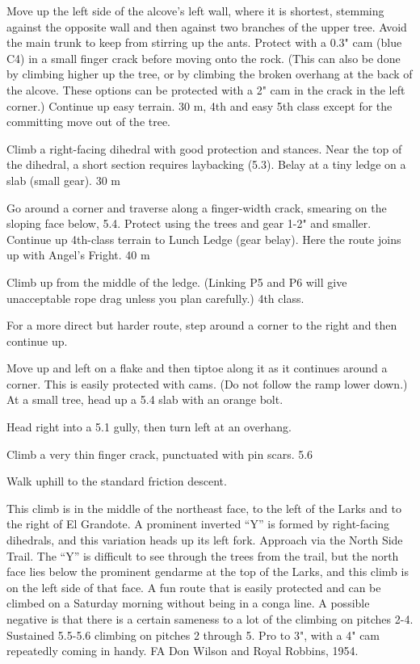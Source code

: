 \documentclass{tahquitz}
\begin{document}
 Move up the left side of the alcove's left wall, where it is
shortest, stemming against the opposite wall and then against two  branches
of the upper tree. Avoid the main trunk to keep from stirring up the ants.
Protect with a 0.3" cam (blue C4) in a small
finger crack before moving onto the rock. (This can also be done by
climbing higher up the tree, or by climbing the broken overhang at
the back of the alcove. These options can be protected with a 2" cam
in the crack in the left corner.) Continue up easy terrain. 30 m, 4th and easy 5th class
except for the committing move out of the tree.

 Climb a right-facing dihedral with good protection and
stances. Near the top of the dihedral, a short section requires laybacking (5.3).
Belay at a tiny ledge on a slab (small gear). 30 m

 Go around a corner and traverse along a finger-width crack,
smearing on the sloping face below, 5.4. Protect using the trees and
gear 1-2" and smaller. Continue up 4th-class terrain to Lunch Ledge (gear
belay). Here the route joins up with Angel's Fright. 40 m


 Climb up from the middle of the ledge. (Linking P5 and P6 will
give unacceptable rope drag unless you plan carefully.) 4th class.

 For a more direct but harder route, step around a corner
to the right and then continue up.

 Move up and left on a flake
and then tiptoe along it as it continues around a corner.
This is easily protected with cams. (Do not follow the ramp lower down.) At a small
tree, head up a 5.4 slab with an orange bolt.

 Head right into a 5.1 gully, then turn left at an overhang.

 Climb a very thin finger crack, punctuated with pin scars. 5.6

Walk uphill to the standard friction descent.




This climb is in the middle of the northeast face, to the left of the
Larks and to the right of El Grandote. A prominent inverted ``Y'' is
formed by right-facing dihedrals, and this variation heads up its
left fork. Approach via the North Side Trail. The ``Y'' is difficult to
see through the trees from the trail, but the north face lies below
the prominent gendarme at the top of the Larks, and this climb is on
the left side of that face. A fun route that is easily protected and
can be climbed on a Saturday morning without being in a conga line. A
possible negative is that there is a certain sameness to a lot of the
climbing on pitches 2-4. Sustained 5.5-5.6 climbing on pitches 2
through 5. Pro to 3", with  a 4" cam repeatedly coming in handy.
FA Don Wilson and Royal Robbins, 1954.
\end{document}
